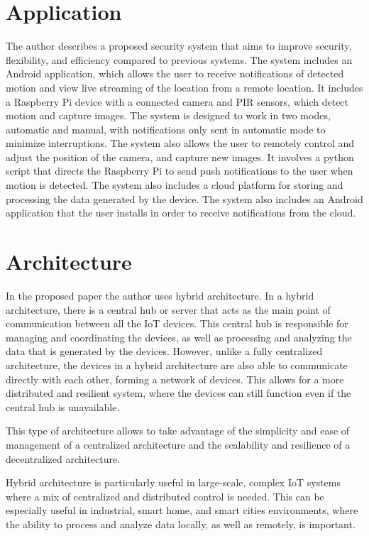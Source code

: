 \documentclass{report}
\begin{document}
\begin{multicols}{1}    
    \section*{Application}
    The author describes a proposed security system that aims to improve security, flexibility, and efficiency compared to previous systems. The system includes an Android application, which allows the user to receive notifications of detected motion and view live streaming of the location from a remote location. It includes a Raspberry Pi device with a connected camera and PIR sensors, which detect motion and capture images. The system is designed to work in two modes, automatic and manual, with notifications only sent in automatic mode to minimize interruptions. The system also allows the user to remotely control and adjust the position of the camera, and capture new images. It involves a python script that directs the Raspberry Pi to send push notifications to the user when motion is detected. The system also includes a cloud platform for storing and processing the data generated by the device. The system also includes an Android application that the user installs in order to receive notifications from the cloud.
    
    \section*{Architecture}
    In the proposed paper the author uses hybrid architecture. In a hybrid architecture, there is a central hub or server that acts as the main point of communication between all the IoT devices. This central hub is responsible for managing and coordinating the devices, as well as processing and analyzing the data that is generated by the devices. However, unlike a fully centralized architecture, the devices in a hybrid architecture are also able to communicate directly with each other, forming a network of devices. This allows for a more distributed and resilient system, where the devices can still function even if the central hub is unavailable.

    This type of architecture allows to take advantage of the simplicity and ease of management of a centralized architecture and the scalability and resilience of a decentralized architecture.
    
    Hybrid architecture is particularly useful in large-scale, complex IoT systems where a mix of centralized and distributed control is needed. This can be especially useful in industrial, smart home, and smart cities environments, where the ability to process and analyze data locally, as well as remotely, is important.
    

\end{multicols}
\end{document}
